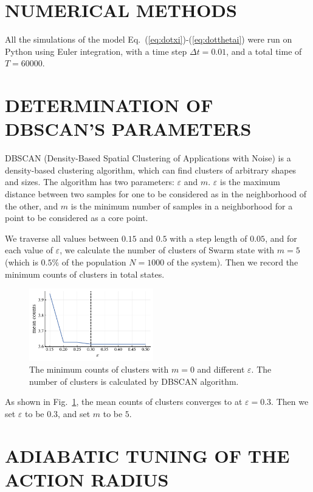 \documentclass[%
 aip,
 amsmath,amssymb,
 reprint,%
]{revtex4-1}
\begin{document}
\section{\label{sec:numerics} NUMERICAL METHODS}

All the simulations of the model Eq.~(\ref{eq:dotxi})-(\ref{eq:dotthetai}) were run on Python using Euler integration, with a time step $\Delta t=0.01$, and a total time of $T=60000$. 


\section{\label{sec:DBSCAN_param} DETERMINATION OF DBSCAN'S PARAMETERS}

DBSCAN (Density-Based Spatial Clustering of Applications with Noise) is a density-based clustering algorithm, which can find clusters of arbitrary shapes and sizes. The algorithm has two parameters: $\varepsilon$ and $m$. $\varepsilon$ is the maximum distance between two samples for one to be considered as in the neighborhood of the other, and $m$ is the minimum number of samples in a neighborhood for a point to be considered as a core point. 

We traverse all values between $0.15$ and $0.5$ with a step length of $0.05$, and for each value of $\varepsilon$, we calculate the number of clusters of Swarm state with $m=5$ (which is $0.5\%$ of the population $N=1000$ of the system). Then we record the minimum counts of clusters in total states. 

\begin{figure}[H]
    \includegraphics[width=0.48\textwidth]{./figs/DBSCANparam.pdf}
    \caption{
        \label{fig:DBSCANparam} The minimum counts of clusters with $m=0$ and different $\varepsilon$. The number of clusters is calculated by DBSCAN algorithm. 
    }
\end{figure}
As shown in Fig.~\ref{fig:DBSCANparam}, the mean counts of clusters converges to at $\varepsilon=0.3$. Then we set $\varepsilon$ to be $0.3$, and set $m$ to be $5$.

\section{\label{sec:Adiabatic} ADIABATIC TUNING OF THE ACTION RADIUS}
\end{document}
